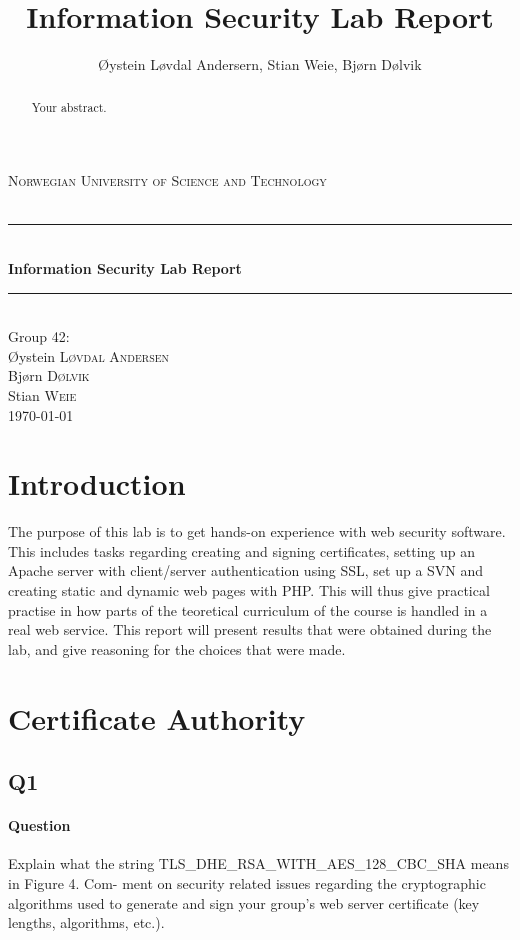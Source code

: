 \documentclass[11pt, a4paper]{article}
\title{Information Security Lab Report}
\author{Øystein Løvdal Andersern, Stian Weie, Bjørn Dølvik}
\newcommand{\HRule}{\rule{\linewidth}{0.5mm}}
\begin{document}
\begin{titlepage}
\begin{center}

\textsc{\LARGE Norwegian University of Science and Technology}\\[1.5cm]

\textsc{\Large }\\[0.5cm]

\HRule \\[0.4cm]
{ \huge \bfseries Information Security Lab Report \\[0.4cm] }

\HRule \\[1.5cm]

{\large Group 42:}\\[0.5cm]

Øystein \textsc{Løvdal Andersen}\\
Bjørn \textsc{Dølvik}\\
Stian \textsc{Weie}\\[4.0cm]

{\large \today}

\end{center}
\end{titlepage}

\begin{abstract}
Your abstract.
\end{abstract}
\tableofcontents
\clearpage

\section{Introduction}
The purpose of this lab is to get hands-on experience with web security software. This includes tasks regarding creating and signing certificates, setting up an Apache server with client/server authentication using SSL, set up a SVN and creating static and dynamic web pages with PHP. This will thus give practical practise in how parts of the teoretical curriculum of the course is handled in a real web service. This report will present results that were obtained during the lab, and give reasoning for the choices that were made. 
\section{Certificate Authority}
\subsection{Q1}
\paragraph{Question}
Explain what the string TLS\_DHE\_RSA\_WITH\_AES\_128\_CBC\_SHA means in Figure 4. Com-
ment on security related issues regarding the cryptographic algorithms used to generate and
sign your group’s web server certificate (key lengths, algorithms, etc.).
\end{document}
